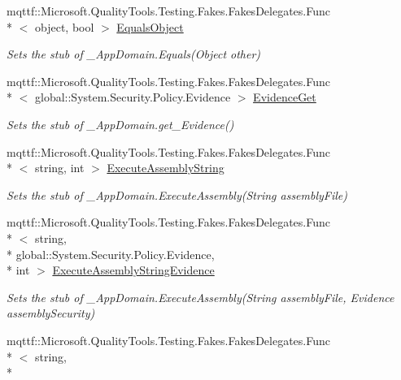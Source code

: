 \begin{DoxyCompactItemize}
mqttf\-::\-Microsoft.\-Quality\-Tools.\-Testing.\-Fakes.\-Fakes\-Delegates.\-Func\\*
$<$ object, bool $>$ \hyperlink{class_system_1_1_fakes_1_1_stub___app_domain_a4d0da4288f2c8a9fc2bd489c4c89afda}{Equals\-Object}
\begin{DoxyCompactList}\small\item\em Sets the stub of \-\_\-\-App\-Domain.\-Equals(\-Object other)\end{DoxyCompactList}\item 
mqttf\-::\-Microsoft.\-Quality\-Tools.\-Testing.\-Fakes.\-Fakes\-Delegates.\-Func\\*
$<$ global\-::\-System.\-Security.\-Policy.\-Evidence $>$ \hyperlink{class_system_1_1_fakes_1_1_stub___app_domain_ae0df64071d18b91ee1b7e405afcf38ab}{Evidence\-Get}
\begin{DoxyCompactList}\small\item\em Sets the stub of \-\_\-\-App\-Domain.\-get\-\_\-\-Evidence()\end{DoxyCompactList}\item 
mqttf\-::\-Microsoft.\-Quality\-Tools.\-Testing.\-Fakes.\-Fakes\-Delegates.\-Func\\*
$<$ string, int $>$ \hyperlink{class_system_1_1_fakes_1_1_stub___app_domain_a79d6d64d6de2200d55d65ead064ccc76}{Execute\-Assembly\-String}
\begin{DoxyCompactList}\small\item\em Sets the stub of \-\_\-\-App\-Domain.\-Execute\-Assembly(\-String assembly\-File)\end{DoxyCompactList}\item 
mqttf\-::\-Microsoft.\-Quality\-Tools.\-Testing.\-Fakes.\-Fakes\-Delegates.\-Func\\*
$<$ string, \\*
global\-::\-System.\-Security.\-Policy.\-Evidence, \\*
int $>$ \hyperlink{class_system_1_1_fakes_1_1_stub___app_domain_a2dadcc02c8a03b9a9bc5916c5eef5275}{Execute\-Assembly\-String\-Evidence}
\begin{DoxyCompactList}\small\item\em Sets the stub of \-\_\-\-App\-Domain.\-Execute\-Assembly(\-String assembly\-File, Evidence assembly\-Security)\end{DoxyCompactList}\item 
mqttf\-::\-Microsoft.\-Quality\-Tools.\-Testing.\-Fakes.\-Fakes\-Delegates.\-Func\\*
$<$ string, \\*

\end{DoxyCompactItemize}
